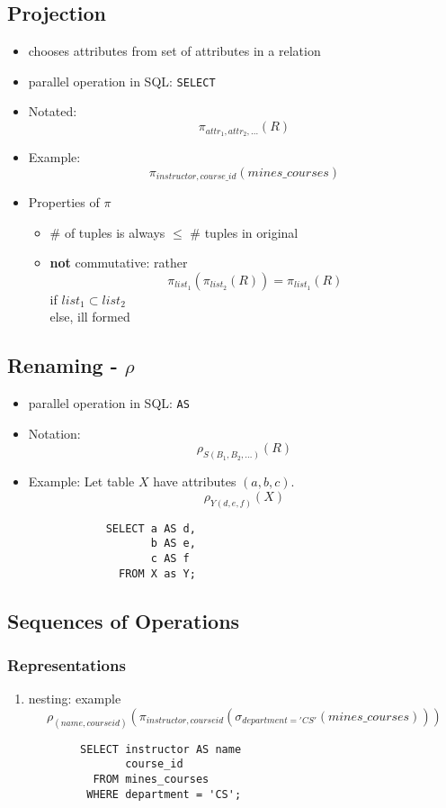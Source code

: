 \documentclass{../cheatsheet}
\begin{document}
\begin{multicols*}{2}
    \subsection{Projection}
    \begin{itemize}
        \item chooses attributes from set of attributes in a relation
        \item parallel operation in SQL: \texttt{SELECT}
        \item Notated:
            \[\pi_{attr_1,attr_2,\dots}(R)\]
        \item Example:
            \[\pi_{instructor, course\_id}(mines\_courses)\]
        \item Properties of $\pi$
            \begin{itemize}
                \item \# of tuples is always $\leq$ \# tuples in original
                \item \textbf{not} commutative: rather
                    \[\pi_{list_1}(\pi_{list_2}(R)) = \pi_{list_1}(R)\]
                    if $list_1 \subset list_2$\\
                    else, ill formed
            \end{itemize}
    \end{itemize}

    \subsection{Renaming - $\rho$}
    \begin{itemize}
        \item parallel operation in SQL: \texttt{AS}
        \item Notation:
            \[\rho_{S(B_1, B_2,\dots)}(R) \]
        \item Example:
            Let table $X$ have attributes $(a, b, c)$.
            \[\rho_{Y(d, e, f)}(X)\]
            \begin{verbatim}
            SELECT a AS d,
                   b AS e,
                   c AS f
              FROM X as Y;
            \end{verbatim}
    \end{itemize}

    \subsection{Sequences of Operations}
    \subsubsection{Representations}
    \begin{enumerate}
        \item nesting: example
            \[ \rho_{(name, courseid)}(\pi_{instructor,
            courseid}(\sigma_{department='CS'}(mines\_courses))) \]
            \begin{verbatim}
        SELECT instructor AS name
               course_id
          FROM mines_courses
         WHERE department = 'CS';
            \end{verbatim}


\end{enumerate}
\end{multicols*}
\end{document}
